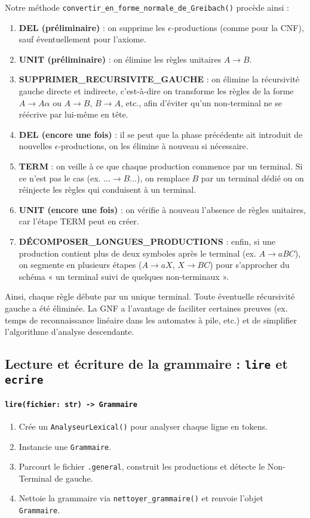 \documentclass[a4paper,12pt]{article}
\begin{document}
Notre méthode \texttt{convertir\_en\_forme\_normale\_de\_Greibach()} procède ainsi :
\begin{enumerate}
    \item \textbf{DEL (préliminaire)} : on supprime les \(\epsilon\)-productions (comme pour la CNF), sauf éventuellement pour l’axiome.  
    \item \textbf{UNIT (préliminaire)} : on élimine les règles unitaires \(A \to B\).  
    \item \textbf{SUPPRIMER\_RECURSIVITE\_GAUCHE} : on élimine la récursivité gauche directe et indirecte, c’est-à-dire on transforme les règles de la forme \(A \to A\alpha\) ou \(A \to B\), \(B \to A\), etc., afin d’éviter qu’un non-terminal ne se réécrive par lui-même en tête.  
    \item \textbf{DEL (encore une fois)} : il se peut que la phase précédente ait introduit de nouvelles \(\epsilon\)-productions, on les élimine à nouveau si nécessaire.  
    \item \textbf{TERM} : on veille à ce que chaque production commence par un terminal. Si ce n’est pas le cas (ex. \(\ldots \to B \ldots\)), on remplace \(B\) par un terminal dédié ou on réinjecte les règles qui conduisent à un terminal.  
    \item \textbf{UNIT (encore une fois)} : on vérifie à nouveau l’absence de règles unitaires, car l’étape TERM peut en créer.  
    \item \textbf{DÉCOMPOSER\_LONGUES\_PRODUCTIONS} : enfin, si une production contient plus de deux symboles après le terminal (ex. \(A \to a B C\)), on segmente en plusieurs étapes (\(A \to a X\), \(X \to B C\)) pour s’approcher du schéma « un terminal suivi de quelques non-terminaux ».  
\end{enumerate}

Ainsi, chaque règle débute par un unique terminal. Toute éventuelle récursivité gauche a été éliminée. La GNF a l’avantage de faciliter certaines preuves (ex. temps de reconnaissance linéaire dans les automates à pile, etc.) et de simplifier l’algorithme d’analyse descendante.

\subsection{Lecture et écriture de la grammaire : \texttt{lire} et \texttt{ecrire}}
\label{subsec:lire-ecrire}

\paragraph{\texttt{lire(fichier: str) -> Grammaire}} 
\begin{enumerate}
    \item Crée un \texttt{AnalyseurLexical()} pour analyser chaque ligne en tokens.
    \item Instancie une \texttt{Grammaire}.
    \item Parcourt le fichier \texttt{.general}, construit les productions et détecte le Non-Terminal de gauche.
    \item Nettoie la grammaire via \texttt{nettoyer\_grammaire()} et renvoie l’objet \texttt{Grammaire}.
\end{enumerate}
\end{document}
